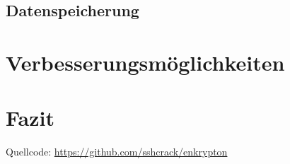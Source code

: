 \documentclass[a4paper,ngerman, headheight=28pt,12pt]{scrartcl}
\begin{document}
\subsection{Datenspeicherung}

\section{Verbesserungsmöglichkeiten}

\section{Fazit}

\pagebreak
\nolinenumbers{}
\printbibliography[notkeyword={figure}]
\label{LastPageDoc}

\pagebreak
{}%
\appendix
\printbibliography[heading=subbibliography,title={Anhang},keyword={figure}]
Quellcode: \href{https://github.com/sshcrack/enkrypton}{https://github.com/sshcrack/enkrypton}
\end{document}
